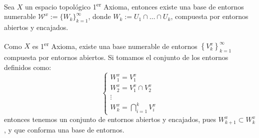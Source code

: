 \begin{prop}
Sea $X$ un espacio topológico 1\textsuperscript{er} Axioma, entonces existe una base de entornos numerable  $\mathcal{W}^x := \{W_k\}_{k = 1}^\infty$, donde $W_k := U_1 \cap \ldots \cap U_k$, compuesta por entornos abiertos y encajados.
\end{prop}
\begin{demo}
Como $X$ es 1\textsuperscript{er} Axioma, existe una base numerable de entornos $\left\{ V_k^x \right\}_{k=1}^\infty$ compuesta por entornos abiertos. Si tomamos el conjunto de los entornos definidos como:
\[
\begin{cases}
W_1^x = V_1^x \\
W_2^x = V_1^x \cap V_2^x \\
\vdots \\
W_k^x = \bigcap_{i = 1}^{k} V_i^x
\end{cases}
\]
entonces tenemos un conjunto de entornos abiertos y encajados, pues $W_{k+1}^x \subset W_{k}^x$, y que conforma una base de entornos.
\end{demo}

